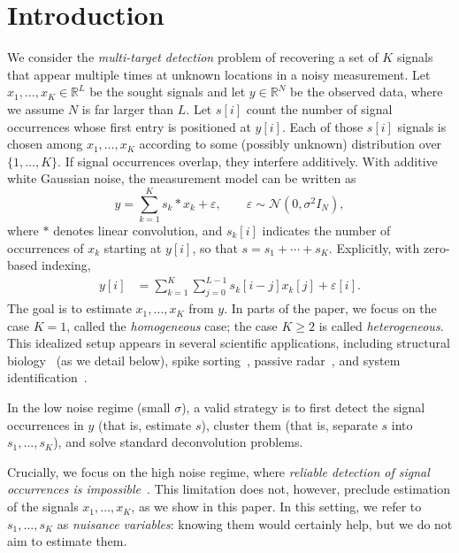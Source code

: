 \documentclass[12pt]{article}
\newcommand{\1}{\mathbf{1}}
\newcommand{\RL}{\mathbb{R}^L}
\newcommand{\RN}{\mathbb{R}^N}
\theoremstyle{plain}
\theoremstyle{definition}
\theoremstyle{remark}
\theoremstyle{plain}
\theoremstyle{remark}
\theoremstyle{plain}
\theoremstyle{plain}
\theoremstyle{plain}
\numberwithin{equation}{section}
\begin{document}
\section{Introduction} \label{sec:intro}

We consider the \emph{multi-target detection} problem of recovering a set of $K$ signals that appear 
multiple times at unknown locations in a noisy measurement.
Let ${x_1,\ldots,x_K\in\RL}$ be the sought signals and let $y\in\RN$ be the observed data, where we assume $N$ is  far larger than $L$. 
Let  $s[i]$ count the number of signal occurrences whose first entry is positioned at $y[i]$. Each of those $s[i]$ signals is chosen among $x_1, \ldots, x_K$ according to some (possibly unknown) distribution over $\{1,\ldots,K\}$. 
If signal occurrences overlap, they interfere additively. %
With additive white Gaussian noise, the measurement model can be written as 
\begin{equation} 
	y  =  \sum_{k=1}^K s_k \ast x_k + \varepsilon, \qquad  \varepsilon   \sim \mathcal{N}(0,\sigma^2 I_N),
	\label{eq:model}
\end{equation}
where $\ast$ denotes linear convolution, and $s_k[i]$ indicates the number of occurrences of $x_k$ starting at $y[i]$, so that $s =  s_1+\cdots+s_K$. Explicitly, with zero-based indexing, %
\begin{align*}
	y[i] & = \sum_{k=1}^{K} \sum_{j = 0}^{L-1} s_k[i-j] x_k[j] + \varepsilon[i].
\end{align*}
%
The goal is  to estimate $x_1,\ldots,x_K$ from $y$. %
In parts of the paper, we focus on the case $K = 1$, called the \emph{homogeneous} case; the case $K \geq 2$ is called \emph{heterogeneous}.
This idealized setup appears in several scientific applications, including structural biology~\cite{bendory2018toward} (as we detail below), spike sorting~\cite{lewicki1998review}, passive radar~\cite{gogineni2017passive}, and system identification~\cite{ljung1998system}. 

In the low noise regime (small $\sigma$), a valid strategy is to first detect the signal occurrences in $y$ (that is, estimate $s$), cluster them (that is, separate $s$ into $s_1,\ldots,s_K$), and solve  standard deconvolution problems.

Crucially, we focus on the high noise regime, where \emph{reliable detection of signal occurrences is  impossible}~\cite{bendory2018toward,aguerrebere2016fundamental}.
This limitation does not, however, preclude estimation of the signals $x_1,\ldots,x_K$, as we show in this paper. In this setting, we refer to  $s_1,\ldots,s_K$  as \emph{nuisance variables}: knowing them would certainly help, but we do not aim to estimate them.
\end{document}
